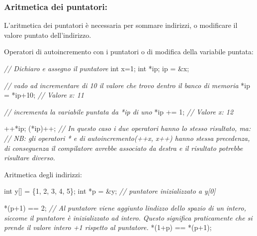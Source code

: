 \documentclass[
]{article}
\newenvironment{Shaded}{}{}
\newcommand{\CommentTok}[1]{\textcolor[rgb]{0.38,0.63,0.69}{\textit{#1}}}
\newcommand{\DataTypeTok}[1]{\textcolor[rgb]{0.56,0.13,0.00}{#1}}
\newcommand{\DecValTok}[1]{\textcolor[rgb]{0.25,0.63,0.44}{#1}}
\newcommand{\NormalTok}[1]{#1}
\begin{document}
\hypertarget{header-n712}{%
\subsubsection{Aritmetica dei puntatori:}\label{header-n712}}

L'aritmetica dei puntatori è necessaria per sommare indirizzi, o
modificare il valore puntato dell'indirizzo.

Operatori di autoincremento con i puntatori o di modifica della
variabile puntata:

\begin{Shaded}
\begin{Highlighting}[]
\CommentTok{// Dichiaro e assegno il puntatore}
\DataTypeTok{int}\NormalTok{ x=}\DecValTok{1}\NormalTok{;}
\DataTypeTok{int}\NormalTok{ *ip;}
\NormalTok{ip = \&x;}

\CommentTok{// vado ad incrementare di 10 il valore che trovo dentro il banco di memoria}
\NormalTok{*ip = *ip+}\DecValTok{10}\NormalTok{;}
\CommentTok{// Valore x: 11}

\CommentTok{// incrementa la variabile puntata da *ip di uno}
\NormalTok{*ip += }\DecValTok{1}\NormalTok{; }
\CommentTok{// Valore x: 12}

\NormalTok{++*ip; }
\NormalTok{(*ip)++;}
\CommentTok{// In questo caso i due operatori hanno lo stesso risultato, ma:}
\CommentTok{// NB: gli operatori * e di autoincremento(++x, x++) hanno stessa precedenza, di conseguenza il compilatore avrebbe associato da destra e il risultato potrebbe risultare diverso.}
\end{Highlighting}
\end{Shaded}

Aritmetica degli indirizzi:

\begin{Shaded}
\begin{Highlighting}[]
\DataTypeTok{int}\NormalTok{ y[] = \{}\DecValTok{1}\NormalTok{, }\DecValTok{2}\NormalTok{, }\DecValTok{3}\NormalTok{, }\DecValTok{4}\NormalTok{, }\DecValTok{5}\NormalTok{\};}
\DataTypeTok{int}\NormalTok{ *p = \&y; }\CommentTok{// puntatore inizializzato a y[0]}

\NormalTok{*(p+}\DecValTok{1}\NormalTok{) == }\DecValTok{2}\NormalTok{; }\CommentTok{// Al puntatore viene aggiunto l\textquotesingle{}indizzo dello spazio di un intero, siccome il puntatore è inizializzato ad intero. Questo significa praticamente che si prende il valore intero +1 rispetto al puntatore.}
\NormalTok{*(}\DecValTok{1}\NormalTok{+p) == *(p+}\DecValTok{1}\NormalTok{); }
\end{Highlighting}
\end{Shaded}
\end{document}
